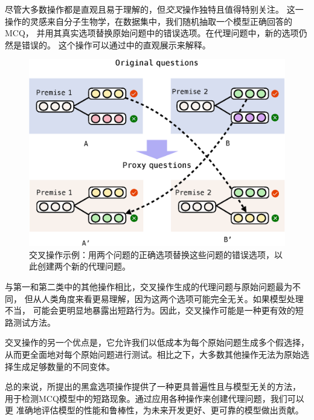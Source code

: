 尽管大多数操作都是直观且易于理解的，但\textit{交叉}操作独特且值得特别关注。
这一操作的灵感来自分子生物学，在数据集中，我们随机抽取一个模型正确回答的MCQ，
并用其真实选项替换原始问题中的错误选项。在代理问题中，新的选项仍然是错误的。
这个操作可以通过中的直观展示来解释。

\begin{figure}[th]
\centering
\includegraphics[width=0.8\columnwidth]{figures/ecai/cross.eps}
\caption{交叉操作示例：用两个问题的正确选项替换这些问题的错误选项，以此创建两个新的代理问题。}
\label{fig3:cross}
\end{figure}

%


与第一和第二类中的其他操作相比，交叉操作生成的代理问题与原始问题最为不同，
但从人类角度来看更易理解，因为这两个选项可能完全无关。如果模型处理不当，
可能会更明显地暴露出短路行为。因此，交叉操作可能是一种更有效的短路测试方法。

交叉操作的另一个优点是，它允许我们以低成本为每个原始问题生成多个假选择，
从而更全面地对每个原始问题进行测试。相比之下，大多数其他操作无法为原始选
择生成足够数量的不同变体。

总的来说，所提出的黑盒选项操作提供了一种更具普遍性且与模型无关的方法，
用于检测MCQ模型中的短路现象。通过应用各种操作来创建代理问题，我们可以更
准确地评估模型的性能和鲁棒性，为未来开发更好、更可靠的模型做出贡献。


